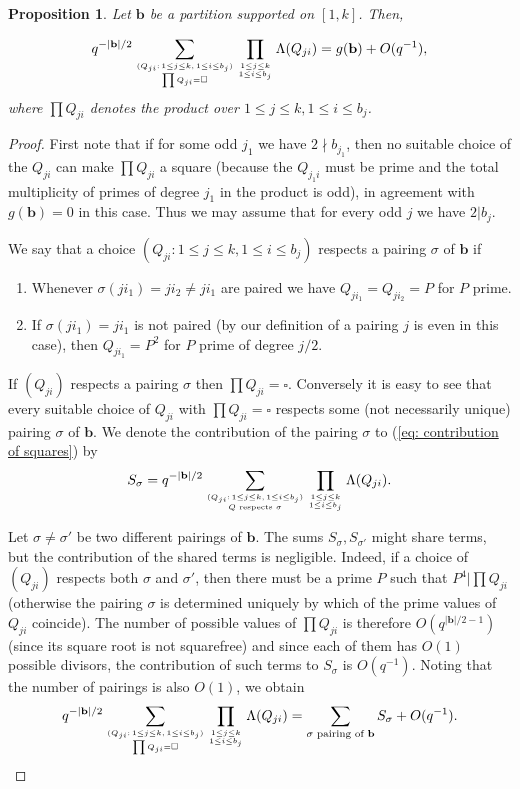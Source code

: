 \documentclass[alphabetic, 
        colorlinks,
        linkcolor=red,  citecolor=blue,
        backref
]{amsart}
\numberwithin{equation}{section}
\newtheorem{prop}[claim]{Proposition}
\theoremstyle{definition}
\begin{document}
\begin{prop}\label{prop_sum_to_pair_up}
Let $\mathbf b$ be a partition supported on $[1,k]$. Then,

\begin{equation}\label{eq: contribution of squares} q^{-|\mathbf b|/2}\sum_{(Q_{ji}:\,1\le j\le k,\,1\le i\le b_j)\atop{\prod Q_{ji}=\square}}\prod_{1\le j\le k\atop{1\le i\le b_j}}\Lambda(Q_{ji})=g(\mathbf b)+O(q^{-1}),
\end{equation}
where $\prod Q_{ji}$ denotes the product over $1\le j\le k,1\le i\le b_j$.
\end{prop}

\begin{proof}
First note that if for some odd $j_1$ we have $2\nmid b_{j_1}$, then no suitable choice of the $Q_{ji}$ can make $\prod Q_{ji}$ a square (because the $Q_{j_1i}$ must be prime and the total multiplicity of primes of degree $j_1$ in the product is odd), in agreement with $g(\mathbf b)=0$ in this case. Thus we may assume that for every odd $j$ we have $2|b_j$. 

We say that a choice $(Q_{ji}:1\le j\le k,1\le i\le b_j)$ respects a pairing $\sigma$ of $\mathbf b$ if
\begin{enumerate}
    \item[(i)] Whenever $\sigma(ji_1)=ji_2\neq ji_1$ are paired we have $Q_{ji_1}=Q_{ji_2}=P$ for $P$ prime.
    \item[(ii)] If $\sigma(ji_1)=ji_1$ is not paired (by our definition of a pairing $j$ is even in this case), then $Q_{ji_1}=P^2$ for $P$ prime of degree $j/2$.
\end{enumerate}
If $(Q_{ji})$  respects a pairing $\sigma$ then $\prod Q_{ji}=\square$. Conversely it is easy to see that every suitable choice of $Q_{ji}$ with $\prod Q_{ji}=\square$ respects some (not necessarily unique) pairing $\sigma$ of $\mathbf b$. We denote the contribution of the pairing $\sigma$ to (\ref{eq: contribution of squares}) by
$$
S_{\sigma}=q^{-|\mathbf b|/2}\sum_{(Q_{ji}:\,1\le j\le k,\,1\le i\le b_j)\atop{Q\text{ respects }\sigma}}\prod_{1\le j\le k\atop{1\le i\le b_j}}\Lambda(Q_{ji}).
$$

Let $\sigma\neq\sigma'$ be two different pairings of $\mathbf b$. The sums $S_{\sigma},S_{\sigma'}$ might share terms, but the contribution of the shared terms is negligible. Indeed, if a choice of $(Q_{ji})$ respects both $\sigma$ and $\sigma'$, then there must be a prime $P$ such that $P^4|\prod Q_{ji}$ (otherwise the pairing $\sigma$ is determined uniquely by which of the prime values of $Q_{ji}$ coincide). The number of possible values of $\prod Q_{ji}$ is therefore $O(q^{|\mathbf b|/2-1})$ (since its square root is not squarefree) and since each of them has $O(1)$ possible divisors, the contribution of such terms to $S_{\sigma}$ is $O(q^{-1})$. Noting that the number of pairings is also $O(1)$, we obtain
\begin{equation}\label{eq: sum of S sigma}q^{-|\mathbf b|/2}\sum_{(Q_{ji}:\,1\le j\le k,\,1\le i\le b_j)\atop{\prod Q_{ji}=\square}}\prod_{1\le j\le k\atop{1\le i\le b_j}}\Lambda(Q_{ji})=\sum_{\sigma\text{ pairing of }\mathbf b}S_\sigma +O(q^{-1}).
\end{equation}


\end{proof}
\end{document}
